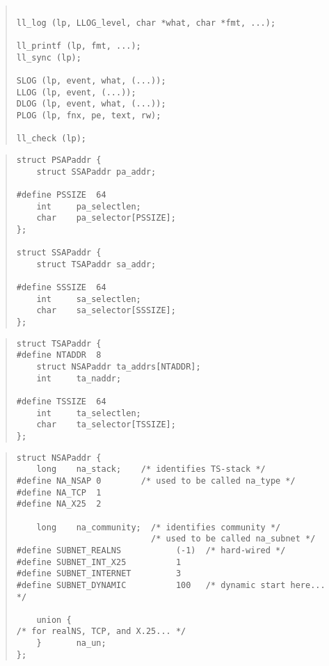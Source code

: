 \begin{bwslide}

\begin{quote}\small\begin{verbatim}

ll_log (lp, LLOG_level, char *what, char *fmt, ...);

ll_printf (lp, fmt, ...);
ll_sync (lp);

SLOG (lp, event, what, (...));
LLOG (lp, event, (...));
DLOG (lp, event, what, (...));
PLOG (lp, fnx, pe, text, rw);

ll_check (lp);
\end{verbatim}\end{quote}
\end{bwslide}


\begin{bwslide}

\begin{quote}\small\begin{verbatim}
struct PSAPaddr {
    struct SSAPaddr pa_addr;

#define PSSIZE  64
    int     pa_selectlen;
    char    pa_selector[PSSIZE];
};

struct SSAPaddr {
    struct TSAPaddr sa_addr;

#define SSSIZE  64
    int     sa_selectlen;
    char    sa_selector[SSSIZE];
};
\end{verbatim}\end{quote}
\end{bwslide}


\begin{bwslide}

\begin{quote}\small\begin{verbatim}
struct TSAPaddr {
#define NTADDR  8
    struct NSAPaddr ta_addrs[NTADDR];
    int     ta_naddr;

#define TSSIZE  64
    int     ta_selectlen;
    char    ta_selector[TSSIZE];
};
\end{verbatim}\end{quote}
\end{bwslide}


\begin{bwslide}

\begin{quote}\small\begin{verbatim}
struct NSAPaddr {
    long    na_stack;    /* identifies TS-stack */
#define NA_NSAP 0        /* used to be called na_type */
#define NA_TCP  1
#define NA_X25  2

    long    na_community;  /* identifies community */
                           /* used to be called na_subnet */
#define SUBNET_REALNS           (-1)  /* hard-wired */
#define SUBNET_INT_X25          1       
#define SUBNET_INTERNET         3
#define SUBNET_DYNAMIC          100   /* dynamic start here... */

    union {
/* for realNS, TCP, and X.25... */
    }       na_un;
};
\end{verbatim}\end{quote}
\end{bwslide}



